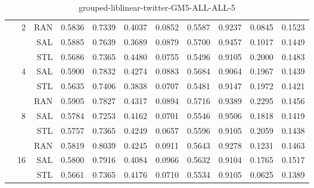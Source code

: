 \begin{center}
\begin{table}[htbp]
\begin{center}
\begin{tabular}{ | r | r | r | r | r | r | r | r | r | r | r |}
 & \multirow{3}{*}{2} & RAN & 0.5836 & 0.7339 & 0.4037 & 0.0852 & 0.5587 & 0.9237 & 0.0845 & 0.1523\\ \cline{3-11}
 &   & SAL & 0.5885 & 0.7639 & 0.3689 & 0.0879 & 0.5700 & 0.9457 & 0.1017 & 0.1449\\ \cline{3-11}
 &   & STL & 0.5686 & 0.7365 & 0.4480 & 0.0755 & 0.5496 & 0.9105 & 0.2000 & 0.1483\\ \cline{2-11}
 & \multirow{3}{*}{4} & SAL & 0.5900 & 0.7832 & 0.4274 & 0.0883 & 0.5684 & 0.9064 & 0.1967 & 0.1439\\ \cline{3-11}
 &   & STL & 0.5635 & 0.7406 & 0.3838 & 0.0707 & 0.5481 & 0.9147 & 0.1972 & 0.1421\\ \cline{3-11}
 &   & RAN & 0.5905 & 0.7827 & 0.4317 & 0.0894 & 0.5716 & 0.9389 & 0.2295 & 0.1456\\ \cline{2-11}
 & \multirow{3}{*}{8} & SAL & 0.5784 & 0.7253 & 0.4162 & 0.0701 & 0.5546 & 0.9506 & 0.1818 & 0.1419\\ \cline{3-11}
 &   & STL & 0.5757 & 0.7365 & 0.4249 & 0.0657 & 0.5596 & 0.9105 & 0.2059 & 0.1438\\ \cline{3-11}
 &   & RAN & 0.5819 & 0.8039 & 0.4245 & 0.0911 & 0.5643 & 0.9278 & 0.1231 & 0.1463\\ \cline{2-11}
 & \multirow{3}{*}{16} & SAL & 0.5800 & 0.7916 & 0.4084 & 0.0966 & 0.5632 & 0.9104 & 0.1765 & 0.1517\\ \cline{3-11}
 &   & STL & 0.5661 & 0.7365 & 0.4176 & 0.0710 & 0.5534 & 0.9105 & 0.0625 & 0.1389\\ \cline{3-11}
\hline
\end{tabular}
\caption{grouped-liblinear-twitter-GM5-ALL-ALL-5}
\end{center}
 \end{table}
\end{center}

